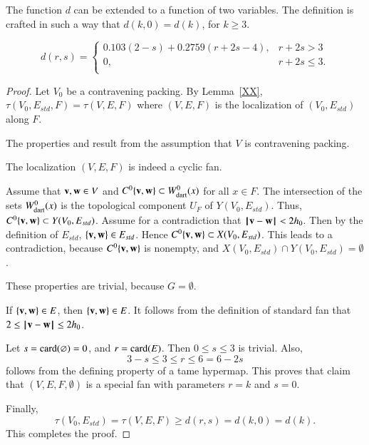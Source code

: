 The function $d$ can be extended to a function of two variables.  The definition is crafted in such a way that $d(k,0) = d(k)$, for $k\ge 3$.

\begin{definition}[d]
$$d(r,s) = \begin{cases}
    0.103 (2-s) + 0.2759 (r+2s-4), & r + 2s > 3\\
    0, & r + 2s \le 3.\\
    \end{cases}$$
\end{definition}



\begin{proof}
Let $V_0$ be a contravening packing.
By Lemma~\ref{XX}, $\tau(V_0,E_{std},F)=\tau(V,E,F)$  where $(V,E,F)$ is the
localization of
$(V_0,E_{std})$ along $F$. 

  The properties  and
 result from the assumption that $V$ is contravening
packing.  

  The localization $(V,E,F)$ is indeed a cyclic fan.

  Assume that ${\mathbf v},{\mathbf w}\in V$ and 
$C^0\{{\mathbf v},{\mathbf w}\}\subset W^0_{\text{dart}}(x)$ for all $x\in F$.
The intersection of the sets $W^0_{\text{dart}}(x)$ is the topological component
$U_F$ of $Y(V_0,E_{std})$.  Thus, $C^0\{{\mathbf v},{\mathbf w}\}\subset Y(V_0,E_{std})$.
Assume for a contradiction that ${\hskip0.1em|\hskip-0.15em|\hskip0.1em}{\mathbf v} - {\mathbf w}{\hskip0.1em|\hskip-0.15em|\hskip0.1em}< 2{h_0}$. Then by the definition of $E_{std}$, $\{{\mathbf v},{\mathbf w}\}\in E_{std}$.
Hence $C^0\{{\mathbf v},{\mathbf w}\}\subset X(V_0,E_{std})$. This leads to a contradiction, because
$C^0\{{\mathbf v},{\mathbf w}\}$ is nonempty, and $X(V_0,E_{std})\cap Y(V_0,E_{std})=\emptyset$.

   These properties are trivial, because $G=\emptyset$.

 If $\{{\mathbf v},{\mathbf w}\}\in E$, then $\{{\mathbf v},{\mathbf w}\}\in E$.  It follows from the definition of
standard fan that $2\le {\hskip0.1em|\hskip-0.15em|\hskip0.1em}{\mathbf v} - {\mathbf w}{\hskip0.1em|\hskip-0.15em|\hskip0.1em}\le 2{h_0}$.

 Let $s={\operatorname{card}}(\varnothing) = 0$, and $r={\operatorname{card}}(E)$.  Then $0\le s\le 3$ is trivial. Also, 
$$3-s \le 3\le r \le 6=6 - 2s$$
follows from the defining property  of a tame hypermap.  This proves that claim that
$(V,E,F,\emptyset)$ is a special fan with parameters $r=k$ and $s=0$.

Finally, 
$$\tau(V_0,E_{std})=\tau(V,E,F) \ge d(r,s) = d(k,0) = d(k).$$  
This completes the proof.
\end{proof}



